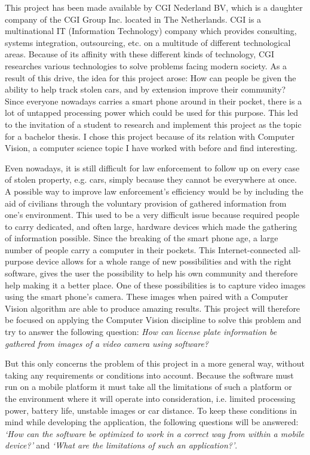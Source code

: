 

This project has been made available by CGI Nederland BV, which is a daughter company of the CGI Group Inc. located in The Netherlands. CGI is a multinational IT (Information Technology) company which provides consulting, systems integration, outsourcing, etc. on a multitude of different technological areas. Because of its affinity with these different kinds of technology, CGI researches various technologies to solve problems facing modern society. As a result of this drive, the idea for this project arose: How can people be given the ability to help track stolen cars, and by extension improve their community? Since everyone nowadays carries a smart phone around in their pocket, there is a lot of untapped processing power which could be used for this purpose. This led to the invitation of a student to research and implement this project as the topic for a bachelor thesis. I chose this project because of its relation with Computer Vision, a computer science topic I have worked with before and find interesting.


Even nowadays, it is still difficult for law enforcement to follow up on every case of stolen property, e.g. cars, simply because they cannot be everywhere at once. A possible way to improve law enforcement's efficiency would be by including the aid of civilians through the voluntary provision of gathered information from one's environment. This used to be a very difficult issue because required people to carry dedicated, and often large, hardware devices which made the gathering of information possible. Since the breaking of the smart phone age, a large number of people carry a computer in their pockets. This Internet-connected all-purpose device allows for a whole range of new possibilities and with the right software, gives the user the possibility to help his own community and therefore help making it a better place. One of these possibilities is to capture video images using the smart phone's camera. These images when paired with a Computer Vision algorithm are able to produce amazing results. This project will therefore be focused on applying the Computer Vision discipline to solve this problem and try to answer the following question: \textit{How can license plate information be gathered from images of a video camera using software?}

But this only concerns the problem of this project in a more general way, without taking any requirements or conditions into account. Because the software must run on a mobile platform it must take all the limitations of such a platform or the environment where it will operate into consideration, i.e. limited processing power, battery life, unstable images or car distance. To keep these conditions in mind while developing the application, the following questions will be answered: \textit{`How can the software be optimized to work in a correct way from within a mobile device?'} and \textit{`What are the limitations of such an application?'}.

